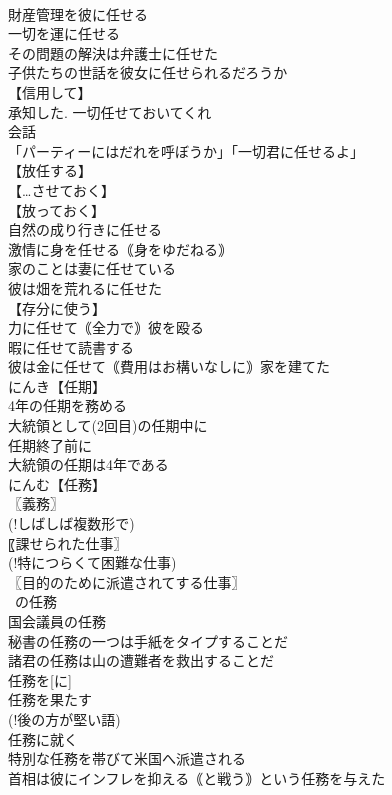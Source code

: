 \documentclass[8pt]{extreport}
\begin{document}
\begin{CJK}{UTF8}{min}
\\	財産管理を彼に任せる
\\	一切を運に任せる
\\	その問題の解決は弁護士に任せた
\\	子供たちの世話を彼女に任せられるだろうか
\\	【信用して】
\\	承知した. 一切任せておいてくれ
\\	会話
\\	「パーティーにはだれを呼ぼうか」「一切君に任せるよ」
\\	【放任する】
\\	【…させておく】
\\	【放っておく】
\\	自然の成り行きに任せる
\\	激情に身を任せる｟身をゆだねる｠
\\	家のことは妻に任せている
\\	彼は畑を荒れるに任せた
\\	【存分に使う】
\\	力に任せて｟全力で｠彼を殴る
\\	暇に任せて読書する
\\	彼は金に任せて｟費用はお構いなしに｠家を建てた
\\	にんき【任期】
\\	4年の任期を務める
\\	大統領として(2回目)の任期中に
\\	任期終了前に
\\	大統領の任期は4年である
\\	にんむ【任務】
\\	〖義務〗
\\	(!しばしば複数形で) 
\\	〖課せられた仕事〗
\\	(!特につらくて困難な仕事) 
\\	〖目的のために派遣されてする仕事〗
\\	~の任務
\\	国会議員の任務
\\	秘書の任務の一つは手紙をタイプすることだ
\\	諸君の任務は山の遭難者を救出することだ
\\	任務を[に]
\\	任務を果たす
\\	(!後の方が堅い語) 
\\	任務に就く
\\	特別な任務を帯びて米国へ派遣される
\\	首相は彼にインフレを抑える｟と戦う｠という任務を与えた

\end{CJK}
\end{document}
